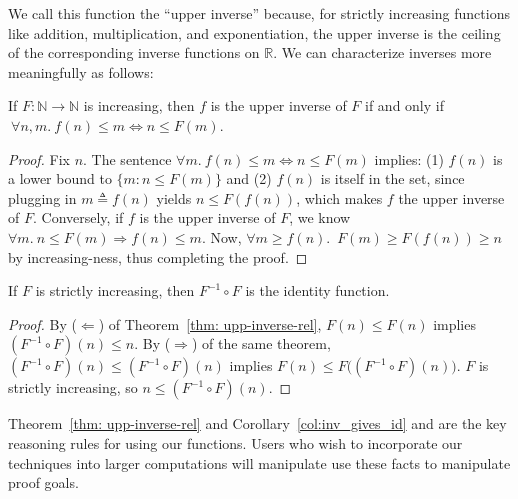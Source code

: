 We call this function the ``upper inverse'' because, for strictly increasing functions like
addition, multiplication, and exponentiation, the upper inverse is the ceiling of the 
corresponding inverse functions on $\mathbb{R}$. We can characterize inverses more meaningfully as follows: 
\begin{thm} \label{thm: upp-inverse-rel}
	If $F:\mathbb{N}\to \mathbb{N}$ is increasing, then $f$ is the upper inverse of $F$ if and only if $\ \forall n, m.~ f(n)\le m \iff n \le F(m)$.
\end{thm}
\begin{proof}
Fix $n$. The sentence $\forall m.~ f(n)\le m \iff n\le F(m)$ implies: (1) $f(n)$ is a lower bound to $\{m: n \le F(m)\}$ and (2) $f(n)$ is itself in the set, since plugging in $m \triangleq f(n)$ yields $n\le F(f(n))$, which makes $f$ the upper inverse of $F$. Conversely, if $f$ is the upper inverse of $F$, we know $\forall m.~n\le F(m)\Rightarrow f(n)\le m$. Now, $\forall m \ge f(n)$.~$F(m)\ge F(f(n)) \ge n$ by increasing-ness, thus completing the proof.
\end{proof}
\begin{col}\label{col:inv_gives_id}
If $F$ is strictly increasing, then $F^{-1} \circ F$ is
the identity function.
\end{col}
\begin{proof}
By ($\Leftarrow$) of Theorem~\ref{thm: upp-inverse-rel}, $F(n) \le F(n)$ implies 
$(F^{-1} \circ F)(n) \le n$.  By ($\Rightarrow$) of the same theorem, $(F^{-1} \circ F)(n) \le (F^{-1} \circ F)(n)$ implies $F(n) \le F \big((F^{-1} \circ F)(n)\big)$. $F$ is strictly increasing, so $n \le (F^{-1} \circ F)(n)$.
\end{proof}

\begin{rem}
Theorem~\ref{thm: upp-inverse-rel} and Corollary~\ref{col:inv_gives_id} 
and are the key reasoning rules for using our functions. Users who wish 
to incorporate our techniques into larger computations will manipulate
use these facts to manipulate proof goals.
\end{rem}


